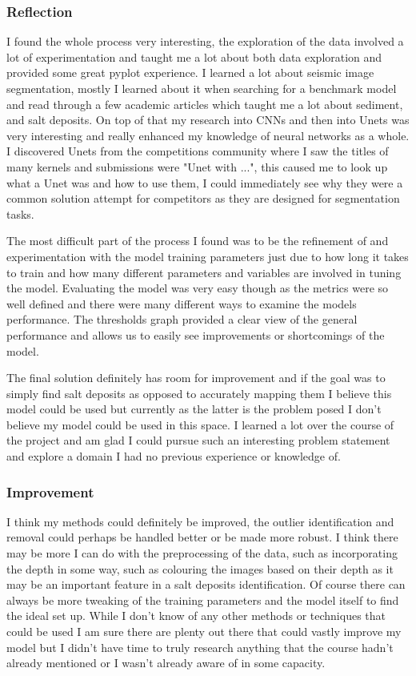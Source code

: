 \documentclass[11pt]{article}
\begin{document}
\subsubsection{Reflection}\label{reflection}

I found the whole process very interesting, the exploration of the data
involved a lot of experimentation and taught me a lot about both data
exploration and provided some great pyplot experience. I learned a lot
about seismic image segmentation, mostly I learned about it when
searching for a benchmark model and read through a few academic articles
which taught me a lot about sediment, and salt deposits. On top of that
my research into CNNs and then into Unets was very interesting and
really enhanced my knowledge of neural networks as a whole. I discovered
Unets from the competitions community where I saw the titles of many
kernels and submissions were "Unet with ...", this caused me to look up
what a Unet was and how to use them, I could immediately see why they
were a common solution attempt for competitors as they are designed for
segmentation tasks.

The most difficult part of the process I found was to be the refinement
of and experimentation with the model training parameters just due to
how long it takes to train and how many different parameters and
variables are involved in tuning the model. Evaluating the model was
very easy though as the metrics were so well defined and there were many
different ways to examine the models performance. The thresholds graph
provided a clear view of the general performance and allows us to easily
see improvements or shortcomings of the model.

The final solution definitely has room for improvement and if the goal
was to simply find salt deposits as opposed to accurately mapping them I
believe this model could be used but currently as the latter is the
problem posed I don't believe my model could be used in this space. I
learned a lot over the course of the project and am glad I could pursue
such an interesting problem statement and explore a domain I had no
previous experience or knowledge of.

\subsubsection{Improvement}\label{improvement}

I think my methods could definitely be improved, the outlier
identification and removal could perhaps be handled better or be made
more robust. I think there may be more I can do with the preprocessing
of the data, such as incorporating the depth in some way, such as
colouring the images based on their depth as it may be an important
feature in a salt deposits identification. Of course there can always be
more tweaking of the training parameters and the model itself to find
the ideal set up. While I don't know of any other methods or techniques
that could be used I am sure there are plenty out there that could
vastly improve my model but I didn't have time to truly research
anything that the course hadn't already mentioned or I wasn't already
aware of in some capacity.
\end{document}
